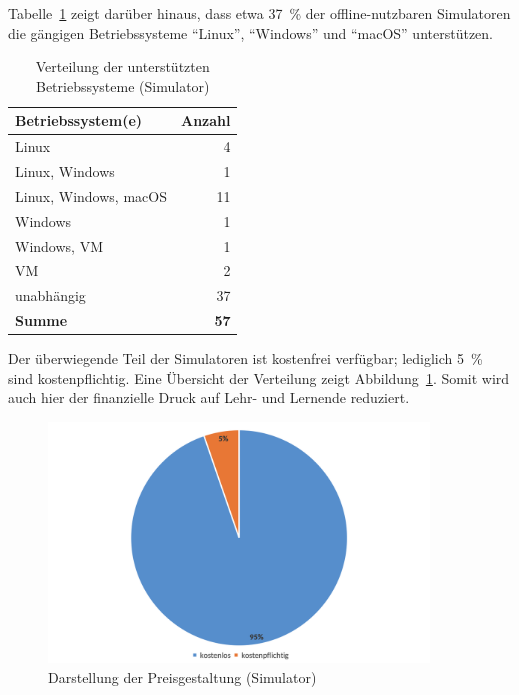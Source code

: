 Tabelle~\ref{tab:os} zeigt darüber hinaus, dass etwa 37~\% der offline-nutzbaren Simulatoren die gängigen Betriebssysteme \enquote{Linux}, \enquote{Windows} und \enquote{macOS} unterstützen.

\begin{table}[h]
	\centering
	\caption{Verteilung der unterstützten Betriebssysteme (Simulator)}
	\label{tab:os}
	\begin{tabular}{l r}
		\toprule
		\textbf{Betriebssystem(e)} & \textbf{Anzahl} \\
		\midrule
		Linux                     & 4  \\
		Linux, Windows            & 1  \\
		Linux, Windows, macOS     & 11 \\
		Windows                   & 1  \\
		Windows, \ac{VM}          & 1  \\
		\ac{VM}                   & 2  \\
		unabhängig                & 37 \\
        \hline
        \textbf{Summe}            & \textbf{57} \\
		\bottomrule
	\end{tabular}
\end{table}

Der überwiegende Teil der Simulatoren ist kostenfrei verfügbar; lediglich 5~\% sind kostenpflichtig. Eine Übersicht der Verteilung zeigt Abbildung~\ref{fig:9-preis}. Somit wird auch hier der finanzielle Druck auf Lehr- und Lernende reduziert.

\begin{figure}[!htbp]
    \centering
    \includegraphics[width=0.90\textwidth]{graphics_sim/9-preis.png}
    \caption{Darstellung der Preisgestaltung (Simulator)}
    \label{fig:9-preis}
\end{figure}

